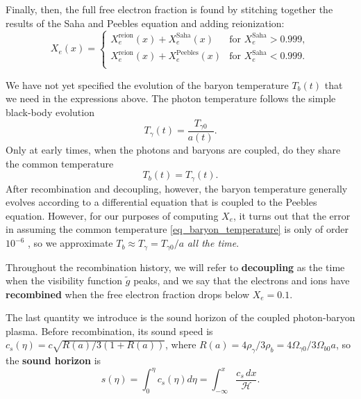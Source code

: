 \documentclass[10pt,a4paper]{article}
\begin{document}
Finally, then, the full free electron fraction is found by stitching together the results of the Saha and Peebles equation and adding reionization:
\begin{equation}
	X_e(x) = \begin{cases}
	             X_e^\text{reion}(x) + X_e^\text{Saha}(x) & \text{for $X_e^\text{Saha} > 0.999$}, \\
	             X_e^\text{reion}(x) + X_e^\text{Peebles}(x) & \text{for $X_e^\text{Saha} < 0.999$}. \\
	         \end{cases}
\label{eq_free_electron_fraction}
\end{equation}

We have not yet specified the evolution of the baryon temperature $T_b(t)$ that we need in the expressions above.
The photon temperature follows the simple black-body evolution
\begin{equation}
	T_\gamma(t) = \frac{T_{\gamma 0}}{a(t)}.
\label{eq_photon_temperature}
\end{equation}
Only at early times, when the photons and baryons are coupled, do they share the common temperature
\begin{equation}
	T_b(t) = T_{\gamma}(t).
\label{eq_baryon_temperature}
\end{equation}
After recombination and decoupling, however,
the baryon temperature generally evolves according to a differential equation that is coupled to the Peebles equation.
However, for our purposes of computing $X_e$,
it turns out that the error in assuming the common temperature \eqref{eq_baryon_temperature} is only of order $10^{-6}$ \cite[page 16]{keskitaloEffectMatterBaryon2005},
so we approximate $T_b \approx T_\gamma = T_{\gamma 0} / a$ \emph{all the time}.

Throughout the recombination history, we will refer to
\textbf{decoupling} as the time when the visibility function $\tilde{g}$ peaks,
and we say that the electrons and ions have \textbf{recombined} when the free electron fraction drops below $X_e = 0.1$.

The last quantity we introduce is the sound horizon
of the coupled photon-baryon plasma.
Before recombination, its sound speed is
$c_s(\eta) = c \sqrt{R(a) / 3(1+R(a))}$,
where $R(a) = 4 \rho_\gamma / 3 \rho_b = 4 \Omega_{\gamma 0} / 3 \Omega_{b 0} a$,
so the \textbf{sound horizon} is
\begin{equation}
	s(\eta) = \int_0^\eta c_s(\eta) d\eta = \int_{-\infty}^x \frac{c_s \, dx}{\mathcal{H}}.
\label{eq_sound_horizon}
\end{equation}
\end{document}
